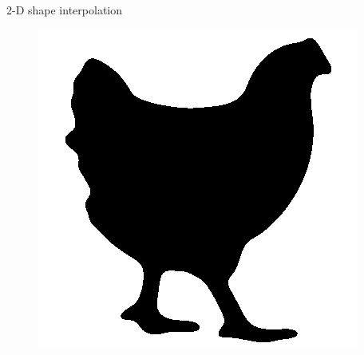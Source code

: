 \begin{frame}{2-D shape interpolation}
\begin{figure}
\begin{minipage}[t]{0.08\linewidth}
        \end{minipage}
        \hfill
        \begin{minipage}[t]{0.08\linewidth}
            \vspace{0pt}
            \centering
            \includegraphics[width=\textwidth]{png/kun-chicken/color9.png}
        \end{minipage}


\end{figure}
\end{frame}
